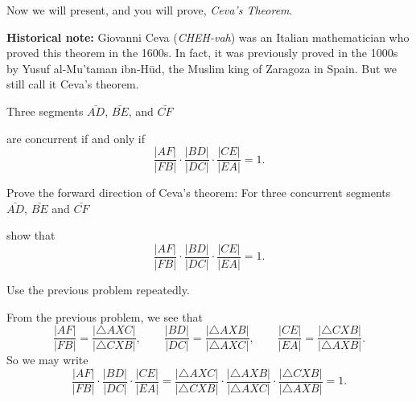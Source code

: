 \documentclass[newpage,hints,handout]{ximera}
\begin{document}
Now we will present, and you will prove, \textit{Ceva's Theorem}. %

\textbf{Historical note:} Giovanni Ceva (\emph{CHEH-vah}) was an Italian
mathematician who proved this theorem in the 1600s.  In fact, it was previously
proved in the 1000s by Yusuf al-Mu'taman ibn-H\=ud, the Muslim king of Zaragoza
in Spain.  But we still call it Ceva's theorem.

\begin{theorem}
Three segments $\bar{AD}$, $\bar{BE}$, and $\bar{CF}$
\begin{image}
\end{image}
are concurrent if and only if 
\[
\frac{|AF|}{|FB|}\cdot\frac{|BD|}{|DC|}\cdot\frac{|CE|}{|EA|}=1.
\]
\end{theorem}

\begin{problem}
Prove the forward direction of Ceva's theorem: For three concurrent
segments $\bar{AD}$, $\bar{BE}$ and $\bar{CF}$
\begin{image}
\end{image}
show that
\[
\frac{|AF|}{|FB|}\cdot\frac{|BD|}{|DC|}\cdot\frac{|CE|}{|EA|}=1.
\]
\begin{hint}
Use the previous problem repeatedly.
\end{hint}
\begin{freeResponse}
From the previous problem, we see that
\[
\frac{|AF|}{|FB|}=\frac{|\triangle AXC|}{|\triangle CXB|},\qquad
\frac{|BD|}{|DC|}=\frac{|\triangle AXB|}{|\triangle AXC|},\qquad
\frac{|CE|}{|EA|}=\frac{|\triangle CXB|}{|\triangle AXB|}.
\]
So we may write
\[
\frac{|AF|}{|FB|}\cdot\frac{|BD|}{|DC|}\cdot\frac{|CE|}{|EA|} = 
\frac{|\triangle AXC|}{|\triangle CXB|}\cdot 
\frac{|\triangle AXB|}{|\triangle AXC|}\cdot
\frac{|\triangle CXB|}{|\triangle AXB|} = 1.
\]
\end{freeResponse}
\end{problem}
\end{document}
